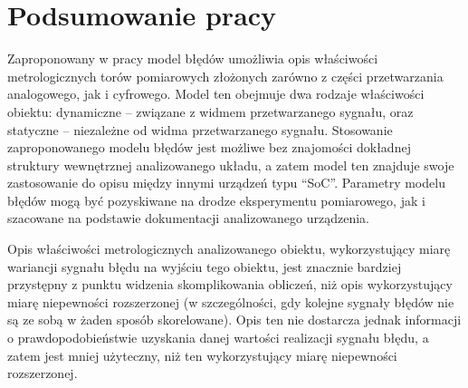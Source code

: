 \chapter{Podsumowanie pracy}

Zaproponowany w pracy model błędów umożliwia opis właściwości metrologicznych torów pomiarowych złożonych zarówno z części przetwarzania analogowego, jak i cyfrowego. Model ten obejmuje dwa rodzaje właściwości obiektu: dynamiczne -- związane z widmem przetwarzanego sygnału, oraz statyczne -- niezależne od widma przetwarzanego sygnału. Stosowanie zaproponowanego modelu błędów jest możliwe bez znajomości dokładnej struktury wewnętrznej analizowanego układu, a zatem model ten znajduje swoje zastosowanie do opisu między innymi urządzeń typu \enquote{SoC}. Parametry modelu błędów mogą być pozyskiwane na drodze eksperymentu pomiarowego, jak i szacowane na podstawie dokumentacji analizowanego urządzenia.

Opis właściwości metrologicznych analizowanego obiektu, wykorzystujący miarę wariancji sygnału błędu na wyjściu tego obiektu, jest znacznie bardziej przystępny z punktu widzenia skomplikowania obliczeń, niż opis wykorzystujący miarę niepewności rozszerzonej (w szczególności, gdy kolejne sygnały błędów nie są ze sobą w żaden sposób skorelowane). Opis ten nie dostarcza jednak informacji o prawdopodobieństwie uzyskania danej wartości realizacji sygnału błędu, a zatem jest mniej użyteczny, niż ten wykorzystujący miarę niepewności rozszerzonej.

